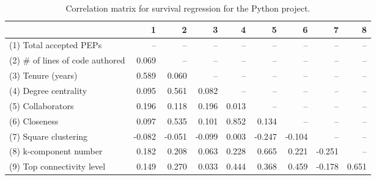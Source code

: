 \begin{table}[H]
\caption{Correlation matrix for survival regression for the Python project.}
\label{corr_table_survival}
\begin{center}
\begin{small}
\begin{tabular}{lrrrrrrrr}
\toprule
{} &      1 &      2 &      3 &     4 &      5 &      6 &      7 &     8 \\
\midrule
(1) Total accepted PEPs         &    -- &    -- &    -- &   -- &    -- &    -- &    -- &   -- \\
(2) \# of lines of code authored &  0.069 &    -- &    -- &   -- &    -- &    -- &    -- &   -- \\
(3) Tenure (years)              &  0.589 &  0.060 &    -- &   -- &    -- &    -- &    -- &   -- \\
(4) Degree centrality           &  0.095 &  0.561 &  0.082 &   -- &    -- &    -- &    -- &   -- \\
(5) Collaborators               &  0.196 &  0.118 &  0.196 & 0.013 &    -- &    -- &    -- &   -- \\
(6) Closeness                   &  0.097 &  0.535 &  0.101 & 0.852 &  0.134 &    -- &    -- &   -- \\
(7) Square clustering           & -0.082 & -0.051 & -0.099 & 0.003 & -0.247 & -0.104 &    -- &   -- \\
(8) k-component number          &  0.182 &  0.208 &  0.063 & 0.228 &  0.665 &  0.221 & -0.251 &   -- \\
(9) Top connectivity level      &  0.149 &  0.270 &  0.033 & 0.444 &  0.368 &  0.459 & -0.178 & 0.651 \\
\bottomrule
\end{tabular}
\end{small} 
\end{center} 
\end{table}

